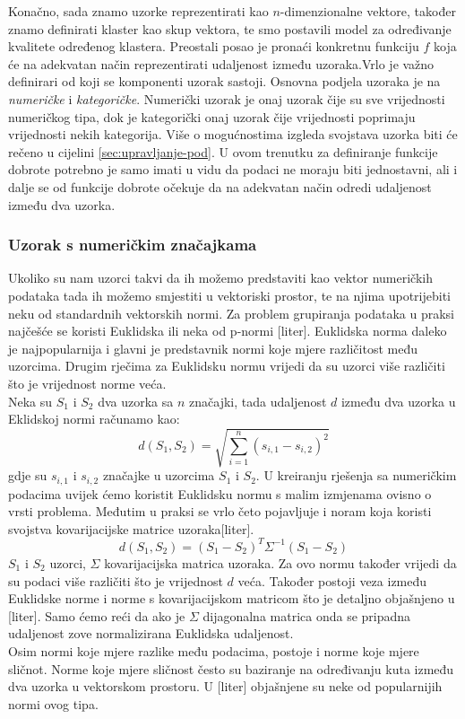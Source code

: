\documentclass[a4paper,twoside,12pt]{memoir} %
\begin{document}
Konačno, sada znamo uzorke reprezentirati kao $n$-dimenzionalne vektore, također znamo definirati klaster kao skup vektora, te smo postavili model za određivanje kvalitete određenog klastera. Preostali posao je pronaći konkretnu funkciju $f$ koja će na adekvatan način reprezentirati udaljenost između uzoraka.Vrlo je važno definirari od koji se komponenti uzorak sastoji. Osnovna podjela uzoraka je na \textit{numeričke} i \textit{kategoričke}. Numerički uzorak je onaj uzorak čije su sve vrijednosti numeričkog tipa, dok je kategorički onaj uzorak čije vrijednosti poprimaju vrijednosti nekih kategorija. Više o mogućnostima izgleda svojstava uzorka biti će rečeno u cijelini \ref{sec:upravljanje-pod}. U ovom trenutku za definiranje funkcije dobrote potrebno je samo imati u vidu da podaci ne moraju biti jednostavni, ali i dalje se od funkcije dobrote očekuje da na adekvatan način odredi udaljenost između dva uzorka.
\subsubsection{Uzorak s numeričkim značajkama}
Ukoliko su nam uzorci takvi da ih možemo predstaviti kao vektor numeričkih podataka tada ih možemo smjestiti u vektoriski prostor, te na njima upotrijebiti neku od standardnih vektorskih normi. Za problem grupiranja podataka u praksi najčešće se koristi Euklidska ili neka od p-normi [liter]. 
Euklidska norma daleko je najpopularnija i glavni je predstavnik normi koje mjere različitost među uzorcima. Drugim rječima za Euklidsku normu vrijedi da su uzorci više različiti što je vrijednost norme veća. \\
Neka su $S_1$ i $S_2$ dva uzorka sa $n$ značajki, tada udaljenost $d$ između dva uzorka u Eklidskoj normi računamo kao:
\begin{equation}
\label{equ:metrika-num}
d(S_1,S_2) = \sqrt{\sum_{i=1}^{n}(s_{i,1} -s_{i,2})^2}
\end{equation}
gdje su $s_{i,1}$ i $s_{i,2}$ značajke u uzorcima $S_1$ i $S_2$. U kreiranju rješenja sa numeričkim podacima uvijek ćemo koristit Euklidsku normu s malim izmjenama ovisno o vrsti problema. Međutim u praksi se vrlo četo pojavljuje i noram koja koristi svojstva kovarijacijske matrice uzoraka[liter]. 
\begin{equation}
d(S_1,S_2) = (S_1-S_2)^T\Sigma^{-1}(S_1-S_2)
\end{equation}
$S_1$ i $S_2$ uzorci, $\Sigma $ kovarijacijska matrica uzoraka. Za ovo normu također vrijedi da su podaci više različiti što je vrijednost $d$ veća. Također postoji veza između Euklidske norme i norme s kovarijacijskom matricom što je detaljno objašnjeno u [liter]. Samo ćemo reći da ako je $\Sigma$ dijagonalna matrica onda se pripadna udaljenost zove normalizirana Euklidska udaljenost.\\
Osim normi koje mjere razlike među podacima, postoje i norme koje mjere sličnot. Norme koje mjere sličnost često su baziranje na određivanju kuta između dva uzorka u vektorskom prostoru. U [liter] objašnjene su neke od popularnijih normi ovog tipa.
\end{document}
